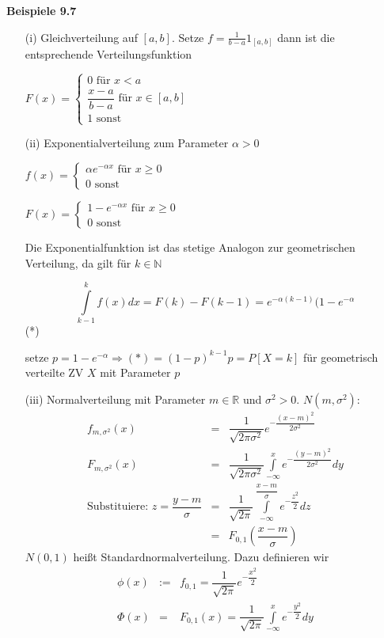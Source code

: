 \documentclass[10pt,a4paper]{report}
\newcommand{\N}{\mathbb{N}}
\newcommand{\R}{\mathbb{R}}
\numberwithin{equation}{section}
\numberwithin{figure}{section}
\theoremstyle{plain}
\theoremstyle{definition}
\theoremstyle{plain}
\theoremstyle{definition}
\theoremstyle{remark}
\theoremstyle{plain}
\theoremstyle{plain}
\theoremstyle{plain}
\newcommand{\1}{ \mathbb{1} } %
\begin{document}
\textbf{Beispiele 9.7}
\begin{itemize}
\item[(i)] Gleichverteilung auf $[a,b]$. Setze $f=\frac{1}{b-a}1_[a,b]$ dann ist die entsprechende Verteilungsfunktion
\begin{center}
$F(x)=\begin{cases}
0 \text{ für } x < a\\
\dfrac{x-a}{b-a} \text{ für } x \in [a,b]\\
1 \text{ sonst }
\end{cases}$
\end{center}
\item[(ii)] Exponentialverteilung zum Parameter $\alpha >0$
\begin{center}
$f(x)=\begin{cases}
\alpha e^{-\alpha x} \text{ für } x \geq 0\\
0 \text{ sonst }
\end{cases}$
\end{center}
\begin{center}
$F(x)=\begin{cases}
1-e^{-\alpha x} \text{ für } x \geq 0\\
0 \text{ sonst }
\end{cases}$
\end{center}
Die Exponentialfunktion ist das stetige Analogon zur geometrischen Verteilung, da gilt für $k \in \N$
\begin{center}
\[ \int\limits_{k-1}^k f(x)dx=F(k)-F(k-1)=e^{-\alpha(k-1)}(1-e^{-\alpha}\] \qquad (*)
\end{center}
setze $p=1-e^{-\alpha} \Rightarrow (*)=(1-p)^{k-1}p=P[X=k]$ für geometrisch verteilte ZV $X$ mit Parameter $p$
\item[(iii)] Normalverteilung mit Parameter $m \in \R$ und $\sigma^2>0$. $N(m,\sigma^2)$:
\begin{eqnarray*}
f_{m,\sigma^2}(x)&=&\dfrac{1}{\sqrt{2\pi \sigma^2}} e^{-\dfrac{(x-m)^2}{2\sigma^2}}\\
F_{m,\sigma^2}(x)&=&\dfrac{1}{\sqrt{2\pi \sigma^2}} \int\limits_{-\infty}^xe^{-\dfrac{(y-m)^2}{2\sigma^2}}dy\\
\text{Substituiere: }z=\dfrac{y-m}{\sigma}&=&\dfrac{1}{\sqrt{2\pi}} \int\limits_{-\infty}^{\dfrac{x-m}{\sigma}}e^{-\dfrac{z^2}{2}}dz\\
&=&F_{0,1}\left(\dfrac{x-m}{\sigma}\right)
\end{eqnarray*}
$N(0,1)$ heißt Standardnormalverteilung. Dazu definieren wir
\begin{eqnarray*}
\phi(x)&:=& f_{0,1}=\dfrac{1}{\sqrt{2\pi}}e^{-\dfrac{x^2}{2}}\\
\Phi(x)&=& F_{0,1}(x)=\dfrac{1}{\sqrt{2\pi}}\int\limits_{-\infty}^x e^{-\dfrac{y^2}{2}}dy
\end{eqnarray*}
\end{itemize}
\end{document}

